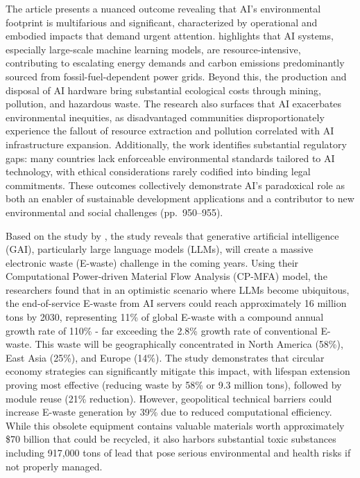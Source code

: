 \documentclass[a4paper, 12pt]{article}
\begin{document}
\par The article presents a nuanced outcome revealing that AI's environmental footprint is multifarious and significant, characterized by operational and embodied impacts that demand urgent attention. \citet{Zhuk2023} highlights that AI systems, especially large-scale machine learning models, are resource-intensive, contributing to escalating energy demands and carbon emissions predominantly sourced from fossil-fuel-dependent power grids. Beyond this, the production and disposal of AI hardware bring substantial ecological costs through mining, pollution, and hazardous waste. The research also surfaces that AI exacerbates environmental inequities, as disadvantaged communities disproportionately experience the fallout of resource extraction and pollution correlated with AI infrastructure expansion. Additionally, the work identifies substantial regulatory gaps: many countries lack enforceable environmental standards tailored to AI technology, with ethical considerations rarely codified into binding legal commitments. These outcomes collectively demonstrate AI's paradoxical role as both an enabler of sustainable development applications and a contributor to new environmental and social challenges (pp.~950--955). \hfill \break
\par Based on the study by \citet{wang_2024_ewaste}, the study reveals that generative artificial intelligence (GAI), particularly large language models (LLMs), will create a massive electronic waste (E-waste) challenge in the coming years. Using their Computational Power-driven Material Flow Analysis (CP-MFA) model, the researchers found that in an optimistic scenario where LLMs become ubiquitous, the end-of-service E-waste from AI servers could reach approximately 16 million tons by 2030, representing 11\% of global E-waste with a compound annual growth rate of 110\% - far exceeding the 2.8\% growth rate of conventional E-waste. This waste will be geographically concentrated in North America (58\%), East Asia (25\%), and Europe (14\%). The study demonstrates that circular economy strategies can significantly mitigate this impact, with lifespan extension proving most effective (reducing waste by 58\% or 9.3 million tons), followed by module reuse (21\% reduction). However, geopolitical technical barriers could increase E-waste generation by 39\% due to reduced computational efficiency. While this obsolete equipment contains valuable materials worth approximately \$70 billion that could be recycled, it also harbors substantial toxic substances including 917,000 tons of lead that pose serious environmental and health risks if not properly managed.\hfill \break 
\end{document}
